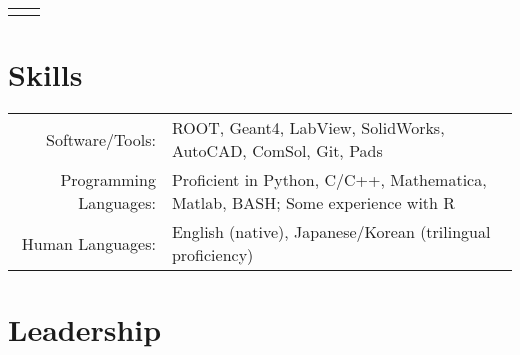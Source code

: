 \documentclass[11pt]{article} %
\begin{document}
\begin{tabularx}{\linewidth}{@{}lR@{}}
{\begin{minipage}[t]{\linewidth}
\begin{itemize}
		\end{itemize}
	\end{minipage}}\\
\end{tabularx}


\section{Skills}

\noindent\begin{tabularx}{\linewidth}{@{}rl}
	Software/Tools: & ROOT, Geant4, LabView, SolidWorks, AutoCAD, ComSol, Git, Pads\\
	Programming Languages: & Proficient in Python, C/C++, Mathematica, Matlab, BASH; Some experience with R\\
	Human Languages: & English (native), Japanese/Korean (trilingual proficiency)\\
\end{tabularx}


\section{Leadership}
\end{document}
